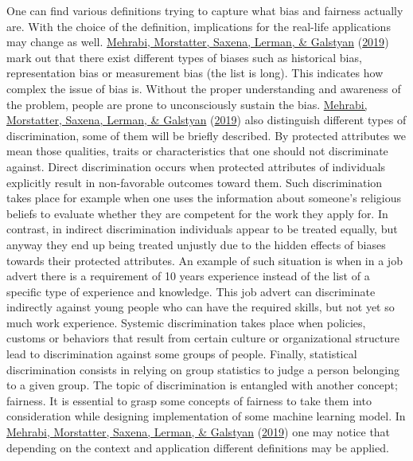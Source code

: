 \documentclass[
  12pt,
]{book}
\begin{document}
One can find various definitions trying to capture what bias and fairness actually are. With the choice of the definition, implications for the real-life applications may change as well. \protect\hyperlink{ref-Mehrabi2019Survey}{Mehrabi, Morstatter, Saxena, Lerman, \& Galstyan} (\protect\hyperlink{ref-Mehrabi2019Survey}{2019}) mark out that there exist different types of biases such as historical bias, representation bias or measurement bias (the list is long). This indicates how complex the issue of bias is. Without the proper understanding and awareness of the problem, people are prone to unconsciously sustain the bias. \protect\hyperlink{ref-Mehrabi2019Survey}{Mehrabi, Morstatter, Saxena, Lerman, \& Galstyan} (\protect\hyperlink{ref-Mehrabi2019Survey}{2019}) also distinguish different types of discrimination, some of them will be briefly described. By protected attributes we mean those qualities, traits or characteristics that one should not discriminate against. Direct discrimination occurs when protected attributes of individuals explicitly result in non-favorable outcomes toward them. Such discrimination takes place for example when one uses the information about someone's religious beliefs to evaluate whether they are competent for the work they apply for. In contrast, in indirect discrimination individuals appear to be treated equally, but anyway they end up being treated unjustly due to the hidden effects of biases towards their protected attributes. An example of such situation is when in a job advert there is a requirement of 10 years experience instead of the list of a specific type of experience and knowledge. This job advert can discriminate indirectly against young people who can have the required skills, but not yet so much work experience. Systemic discrimination takes place when policies, customs or behaviors that result from certain culture or organizational structure lead to discrimination against some groups of people. Finally, statistical discrimination consists in relying on group statistics to judge a person belonging to a given group. The topic of discrimination is entangled with another concept; fairness. It is essential to grasp some concepts of fairness to take them into consideration while designing implementation of some machine learning model. In \protect\hyperlink{ref-Mehrabi2019Survey}{Mehrabi, Morstatter, Saxena, Lerman, \& Galstyan} (\protect\hyperlink{ref-Mehrabi2019Survey}{2019}) one may notice that depending on the context and application different definitions may be applied.
\end{document}
